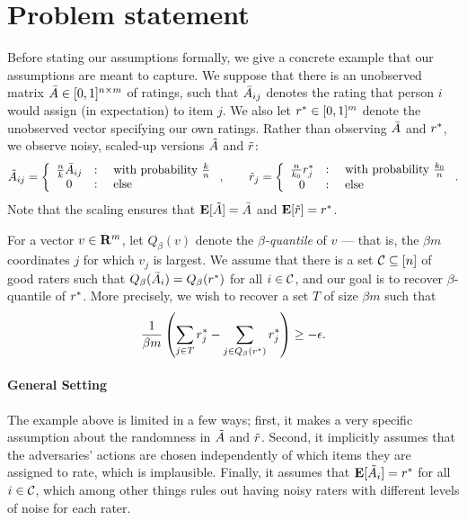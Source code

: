 \section{Problem statement}
\label{sec:assumptions}

Before stating our assumptions formally, we give a concrete example that our 
assumptions are meant to capture. 
We suppose that there is an unobserved matrix $\bar{A} \in [0,1]^{n \times m}$
of ratings, such that $\bar{A}_{ij}$ denotes the rating that person $i$ would 
assign (in expectation) to item $j$. 
We also let $r^* \in [0,1]^m$ denote the unobserved vector 
specifying our own ratings. Rather than observing $\bar{A}$ and $r^*$, 
we observe noisy, scaled-up versions $\tilde{A}$ and $\tilde{r}$:
\[ \tilde{A}_{ij} = \left\{ \begin{array}{ccl} \frac{n}{k}\bar{A}_{ij} & : & \text{ with probability $\frac{k}{n}$} \\ 0 & : & \text{ else} \end{array} \right., \quad\quad 
  \tilde{r}_j = \left\{ \begin{array}{ccl} \frac{n}{k_0}r^*_j & : & \text{ with probability $\frac{k_0}{n}$} \\ 0 & : & \text{ else} \end{array} \right.. \] %
Note that the scaling ensures that $\mathbf{E}[\tilde{A}] = \bar{A}$ and $\mathbf{E}[\tilde{r}] = r^*$. 

For a vector $v \in \mathbf{R}^m$, let $Q_{\beta}(v)$ denote the \emph{$\beta$-quantile} 
of $v$ --- that is, the $\beta m$ coordinates $j$ for which $v_j$ is largest.
We assume that there is a set $\mathcal{C} \subseteq [n]$ of good raters such 
that $Q_{\beta}(\bar{A}_{i}) = Q_{\beta}(r^*)$ for all $i \in \mathcal{C}$, and our 
goal is to recover $\beta$-quantile of $r^*$. More precisely, we wish to 
recover a set $T$ of size $\beta m$ such that
\[ \frac{1}{\beta m}\left( \sum_{j \in T} r^*_j - \sum_{j \in Q_{\beta}(r^*)} r^*_j \right) \geq - \epsilon. \]

\paragraph{General Setting}
The example above is limited in a few ways; first, it makes a very specific 
assumption about the randomness in $\tilde{A}$ and $\tilde{r}$. Second, it implicitly 
assumes that the adversaries' actions are chosen independently of which items 
they are assigned to rate, which is implausible. Finally, it assumes that 
$\mathbf{E}[\tilde{A}_i] = r^*$ for all $i \in \mathcal{C}$, which among other things rules out 
having noisy raters with different levels of noise for each rater.



